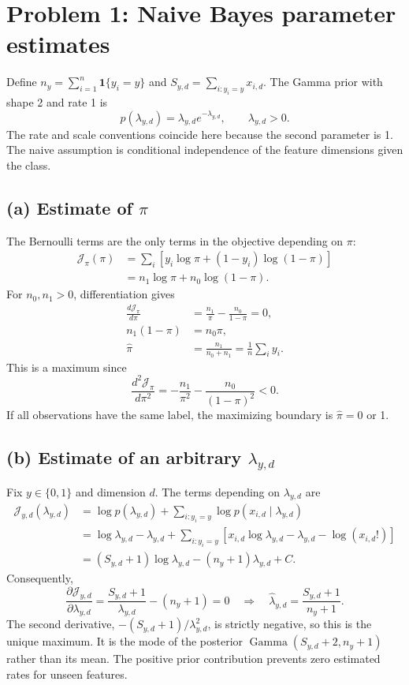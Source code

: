 \documentclass[10pt]{article}
\newcommand{\ind}{\mathbf{1}}
\begin{document}
\section*{Problem 1: Naive Bayes parameter estimates}
Define $n_y=\sum_{i=1}^n\ind\{y_i=y\}$ and $S_{y,d}=\sum_{i:y_i=y}x_{i,d}$.
The Gamma prior with shape 2 and rate 1 is
\[p(\lambda_{y,d})=\lambda_{y,d}e^{-\lambda_{y,d}},\qquad\lambda_{y,d}>0.\]
The rate and scale conventions coincide here because the second parameter is 1.
The naive assumption is conditional independence of the feature dimensions given the class.
\subsection*{(a) Estimate of $\pi$}
The Bernoulli terms are the only terms in the objective depending on $\pi$:
\begin{align*}
\mathcal J_\pi(\pi)&=\sum_i[y_i\log\pi+(1-y_i)\log(1-\pi)]\\
&=n_1\log\pi+n_0\log(1-\pi).
\end{align*}
For $n_0,n_1>0$, differentiation gives
\begin{align*}
\frac{d\mathcal J_\pi}{d\pi}&=\frac{n_1}{\pi}-\frac{n_0}{1-\pi}=0,\\
n_1(1-\pi)&=n_0\pi,\\
\widehat\pi&=\frac{n_1}{n_0+n_1}=\frac1n\sum_i y_i.
\end{align*}
This is a maximum since
\[\frac{d^2\mathcal J_\pi}{d\pi^2}=-\frac{n_1}{\pi^2}-\frac{n_0}{(1-\pi)^2}<0.\]
If all observations have the same label, the maximizing boundary is $\widehat\pi=0$ or 1.
\subsection*{(b) Estimate of an arbitrary $\lambda_{y,d}$}
Fix $y\in\{0,1\}$ and dimension $d$. The terms depending on $\lambda_{y,d}$ are
\begin{align*}
\mathcal J_{y,d}(\lambda_{y,d})
&=\log p(\lambda_{y,d})+\sum_{i:y_i=y}\log p(x_{i,d}\mid\lambda_{y,d})\\
&=\log\lambda_{y,d}-\lambda_{y,d}
+\sum_{i:y_i=y}[x_{i,d}\log\lambda_{y,d}-\lambda_{y,d}-\log(x_{i,d}!)]\\
&=(S_{y,d}+1)\log\lambda_{y,d}-(n_y+1)\lambda_{y,d}+C.
\end{align*}
Consequently,
\[\frac{\partial\mathcal J_{y,d}}{\partial\lambda_{y,d}}
=\frac{S_{y,d}+1}{\lambda_{y,d}}-(n_y+1)=0
\quad\Longrightarrow\quad
\widehat\lambda_{y,d}=\frac{S_{y,d}+1}{n_y+1}.\]
The second derivative, $-(S_{y,d}+1)/\lambda_{y,d}^2$, is strictly negative, so this is the unique maximum.
It is the mode of the posterior $\operatorname{Gamma}(S_{y,d}+2,n_y+1)$ rather than its mean.
The positive prior contribution prevents zero estimated rates for unseen features.
\end{document}
